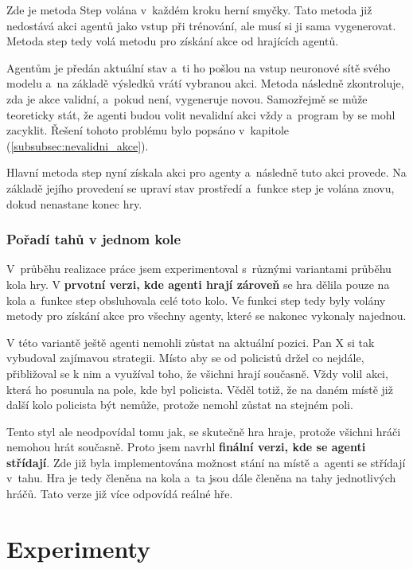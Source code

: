 Zde je metoda Step volána v~každém kroku  herní smyčky.
Tato metoda již nedostává akci agentů jako vstup při trénování, ale musí si ji sama vygenerovat.
Metoda step tedy volá metodu pro získání akce od hrajících agentů.

Agentům je předán aktuální stav a~ti ho pošlou na vstup neuronové sítě svého modelu a~na základě výsledků vrátí vybranou akci.
Metoda následně zkontroluje, zda je akce validní, a~pokud není, vygeneruje novou.
Samozřejmě se může teoreticky stát, že agenti budou volit nevalidní akci vždy a~program by se mohl zacyklit.
Řešení tohoto problému bylo popsáno v~kapitole  (\ref{subsubsec:nevalidni_akce}).

Hlavní metoda step nyní získala akci pro agenty a~následně tuto akci provede.
Na základě jejího provedení se upraví stav prostředí a~funkce step je volána znovu, dokud nenastane konec hry.


\subsection{Pořadí tahů v jednom kole}
V~průběhu realizace práce jsem experimentoval s~různými variantami průběhu kola hry.
V \textbf{prvotní verzi, kde agenti hrají zároveň} se hra dělila pouze na kola a~funkce step obsluhovala celé toto kolo.
Ve funkci step tedy byly volány metody pro získání akce pro všechny agenty, které se nakonec vykonaly najednou.

V této variantě ještě agenti nemohli zůstat na aktuální pozici.
Pan X si tak vybudoval zajímavou strategii.
Místo aby se od policistů držel co nejdále, přibližoval se k nim a využíval toho, že všichni hrají současně.
Vždy volil akci, která ho posunula na pole, kde byl policista.
Věděl totiž, že na daném místě již další kolo policista být nemůže, protože nemohl zůstat na stejném poli.

Tento styl ale neodpovídal tomu jak, se skutečně hra hraje, protože všichni hráči nemohou hrát současně.
Proto jsem navrhl \textbf{finální verzi, kde se agenti střídají}.
Zde již byla implementována možnost stání na místě a~agenti se střídají v~tahu.
Hra je tedy členěna na kola a~ta jsou dále členěna na tahy jednotlivých hráčů.
Tato verze již více odpovídá reálné hře.

\chapter{Experimenty}
\label{ch:experimenty}

